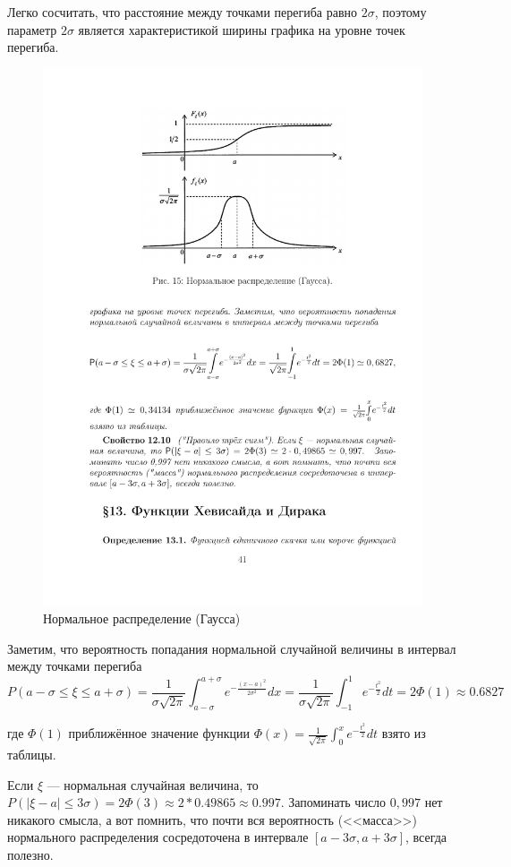 \begin{prop}
 Легко сосчитать, что расстояние между точками перегиба равно $2\sigma$, поэтому параметр $2\sigma$ является характеристикой ширины графика на уровне точек перегиба.

\begin{figure}[h!]
	\centering
	\includegraphics[]{pic/pic15}
	\caption{Нормальное распределение (Гаусса)}
	\label{fig15}
\end{figure}
 Заметим, что вероятность попадания  нормальной случайной величины в интервал между точками перегиба
\begin{equation*}
	P(a − \sigma \leq \xi \leq a + \sigma) = \frac{1}{\sigma \sqrt{2\pi}} \int_{a-\sigma}^{a+\sigma} e^{-\frac{(x-a)^2}{2\sigma^2}}dx =  \frac{1}{\sigma \sqrt{2\pi}} \int_{-1}^{1} e^{-\frac{t^2}{2}}dt = 2\Phi(1) \approx 0.6827
\end{equation*}

где $\Phi(1)$ приближённое значение функции $\Phi (x) = \frac{1}{\sqrt{2\pi}} \int_{0}^{x}e^{-\frac{t^2}{2}}dt$
взято из таблицы.
\end{prop}

\begin{prop}
Если $\xi$ — нормальная случайная величина, то $P(|\xi − a| \leq 3\sigma) = 2\Phi(3) \approx 2*0.49865 \approx 0.997$. Запоминать число $0,997$ нет никакого смысла, а вот помнить, что почти вся
вероятность (<<масса>>) нормального распределения сосредоточена в интервале $[a − 3\sigma, a + 3\sigma]$, всегда полезно.
\end{prop}
